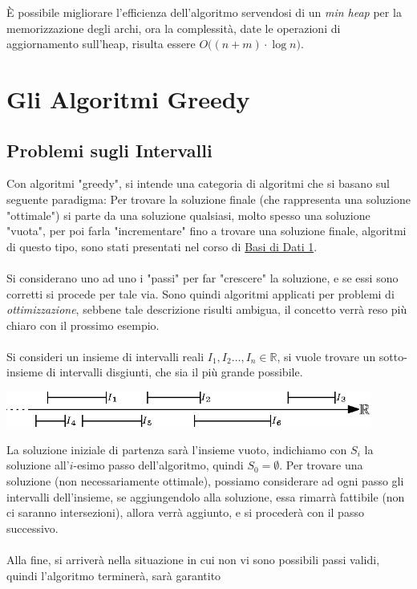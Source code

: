 \documentclass[12pt, letterpaper]{article}
\newcommand{\acc}{\\\hphantom{}\\}
\begin{document}
È possibile migliorare l'efficienza dell'algoritmo servendosi di un \textit{min heap} per la memorizzazione degli archi,
ora la complessità, date le operazioni di aggiornamento sull'heap, risulta essere $O\big((n+m)\cdot\log{n}\big)$.
\section{Gli Algoritmi Greedy}
\subsection{Problemi sugli Intervalli}
Con algoritmi "greedy", si intende una categoria di algoritmi che si basano sul seguente paradigma: Per trovare la soluzione 
finale (che rappresenta una soluzione "ottimale") si parte da una soluzione qualsiasi, molto spesso una soluzione "vuota", per 
poi farla "incrementare" fino a trovare una soluzione finale, algoritmi di questo tipo, sono stati presentati nel corso 
di  
\color{blue}\href{https://github.com/CasuFrost/University_notes/blob/main/Secondo%20Anno/Primo%20Semestre/Basi%20di%20Dati%201/Latex%20source%20file/Basi%20di%20Dati%20modulo%201.pdf}{Basi di Dati 1}.\acc 
\color{black}Si considerano uno ad uno i "passi" per far "crescere" la soluzione, e se essi sono corretti si procede per tale via. Sono quindi algoritmi applicati 
per problemi di \textit{ottimizzazione}, sebbene 
tale descrizione risulti ambigua, il concetto verrà reso più chiaro con il prossimo esempio.\acc 
Si consideri un insieme di intervalli reali $I_1,I_2\dots,I_n \in \mathbb{R}$, si vuole trovare un sotto-insieme di intervalli 
disgiunti, che sia il più grande possibile. \begin{center}
    \includegraphics[width=0.9\textwidth ]{images/intervallIReali.eps}
\end{center}
La soluzione iniziale di partenza sarà l'insieme vuoto, indichiamo con $S_i$ la soluzione all'$i$-esimo passo dell'algoritmo, 
quindi $S_0=\emptyset$. Per trovare una soluzione (non necessariamente ottimale), possiamo considerare ad ogni passo gli intervalli dell'insieme, 
se aggiungendolo alla soluzione, essa rimarrà fattibile (non ci saranno intersezioni), allora verrà aggiunto, e si procederà 
con il passo successivo.\acc 
Alla fine, si arriverà nella situazione in cui non vi sono possibili passi validi, quindi l'algoritmo terminerà, sarà garantito 
\end{document}
